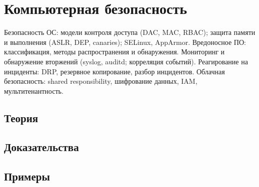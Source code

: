 
\section{Компьютерная безопасность}
\label{sec:2.3b.11-computer-security}

\begin{ticket}
Безопасность ОС: модели контроля доступа (DAC, MAC, RBAC); защита памяти и выполнения (ASLR, DEP, canaries); SELinux, AppArmor. Вредоносное ПО: классификация, методы распространения и обнаружения. Мониторинг и обнаружение вторжений (syslog, auditd; корреляция событий). Реагирование на инциденты: DRP, резервное копирование, разбор инцидентов. Облачная безопасность: shared responsibility, шифрование данных, IAM, мультитенантность.
\end{ticket}

\subsection*{Теория}

\subsection*{Доказательства}

\subsection*{Примеры}
